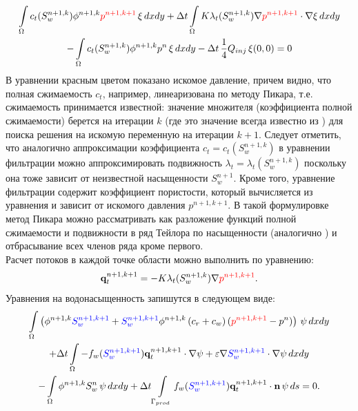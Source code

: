 \begin{multline}\label{eq:FiltrationLinear}
	 \int\limits_\Omega c_t (S_w^{n+1, k})\phi^{n+1, k} {\color{red}p^{n+1, k+1}}\, \xi \,dx dy 
	 + \Delta t \int\limits_\Omega K \lambda_t (S_w^{n+1, k}) \nabla {\color{red}p^{n+1, k+1} }\cdot \nabla\xi \,dx dy \\ 
	 -\int\limits_\Omega c_t (S_w^{n+1, k})\phi^{n+1, k} p^{n}\, \xi \,dx dy-\Delta t\, \frac{1}{4}Q_{inj} \, \xi(0,0) =0
\end{multline}
В уравнении  красным цветом показано искомое давление, причем видно, что полная сжимаемость
 $c_t$, например, линеаризована по методу Пикара, т.е. сжимаемость принимается известной: значение множителя 
 (коэффициента полной сжимаемости) берется на итерации $k$ (где это значение всегда известно из ) 
 для поиска решения на искомую переменную на итерации $k+1$. Следует отметить, что аналогично аппроксимации 
 коэффициента $c_t = c_t (S_w^{n+1, k})$ в уравнении фильтрации можно аппроксимировать подвижность 
$\lambda_t = \lambda_t (S_w^{n+1, k})$ поскольку она тоже зависит от неизвестной насыщенности $S_w^{n+1}$.
Кроме того, уравнение фильтрации содержит коэффициент пористости, который вычисляется из уравнения
 и зависит от искомого давления $p^{n+1, k+1}$. В такой формулировке метод Пикара
можно рассматривать как разложение функций полной сжимаемости и подвижности в ряд Тейлора по насыщенности 
(аналогично ) и отбрасывание всех членов ряда кроме первого.\\
Расчет потоков в каждой точке области можно выполнить по уравнению:
\begin{equation}
	\mathbf{q}_t^{n+1, k+1} = -K\lambda_t (S_w^{n+1,k})\nabla {\color{red}p^{n+1, k+1} }.
\end{equation}
Уравнения на водонасыщенность запишутся в следующем виде:
\begin{multline}\label{eq:saturation_num}
	\int\limits_\Omega \left(\phi^{n+1,k} {\color{blue}S_w^{n+1,k+1}} 
	+ {\color{blue}S_w^{n+1,k+1}}\phi^{n+1,k}\left(c_r + c_w \right)({\color{red}p^{n+1,k+1}} - p^n)  \right)\,\psi \,dx dy \\
	+ \Delta t\int\limits_\Omega -f_w ({\color{blue}S_w^{n+1,k+1}}) \mathbf{q}_t^{n+1, k+1} \cdot \nabla \psi +  \varepsilon \nabla {\color{blue}S_w^{n+1,k+1}} \cdot \nabla \psi \,dx dy \\
	-\int\limits_\Omega \phi^{n+1,k} S_w^{n} \,\psi \,dx dy
	+\Delta t\int\limits_{\Gamma_{prod}} f_w({\color{blue}S_w^{n+1,k+1}}) \mathbf{q}_t^{n+1, k+1} \cdot \mathbf{n} \,\psi \, ds = 0.
\end{multline}
